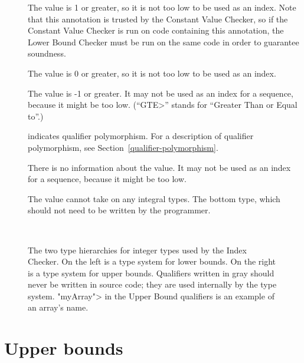 \begin{description}
\item[]
  The value is 1 or greater, so it is not too low to be used as an index.
  Note that this annotation is trusted by the Constant Value Checker,
  so if the Constant Value Checker is run on code containing this annotation,
  the Lower Bound Checker must be run on the same code in order to
  guarantee soundness.
\item[]
  The value is 0 or greater, so it is not too low to be used as an index.
\item[]
  The value is -1 or greater.
  It may not be used as an index for a sequence, because it might be too low.
  (``\<GTE>'' stands for ``Greater Than or Equal to''.)
\item[]
  indicates qualifier polymorphism.
  For a description of qualifier polymorphism, see
  Section~\ref{qualifier-polymorphism}.
\item[]
  There is no information about the value.
  It may not be used as an index for a sequence, because it might be too low.
\item[]
    The value cannot take on any integral types. The bottom type, which
    should not need to be written by the programmer.
\end{description}

\begin{figure}
\begin{center}
  \hfill
  ~~~~\hfill~~~~
  \hfill
\end{center}
  \caption{The two type hierarchies for integer types used by the Index
    Checker.  On the left is a type system for lower bounds.  On the right
    is a type system for upper bounds.  Qualifiers written in gray should
    never be written in source code; they are used internally by the type
    system. \<"myArray"> in the Upper Bound qualifiers is an example of
    an array's name.}
  \label{fig-index-int-types}
\end{figure}


\section{Upper bounds\label{index-upperbound}}

